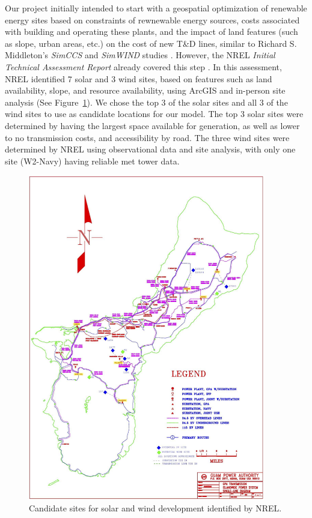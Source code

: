 \documentclass[12pt,letterpaper,fleqn]{article}
\begin{document}
Our project initially intended to start with a geospatial optimization
of renewable energy sites based on constraints of rewnewable energy
sources, costs associated with building and operating these plants,
and the impact of land features (such as slope, urban areas, etc.) on
the cost of new T\&D lines, similar to Richard S. Middleton's
\emph{SimCCS} and \emph{SimWIND} studies \cite{middleton09,
  phillips12}. However, the NREL \emph{Initial Technical Assessment
  Report} already covered this step \cite{misty}. In this assessment,
NREL identified 7 solar and 3 wind sites, based on features such as
land availability, slope, and resource availability, using ArcGIS and
in-person site analysis (See Figure~\ref{fig:sites}). We chose the top
3 of the solar sites and all 3 of the wind sites to use as candidate
locations for our model. The top 3 solar sites were determined by
having the largest space available for generation, as well as lower to
no transmission costs, and accessibility by road. The three wind sites
were determined by NREL using observational data and site analysis,
with only one site (W2-Navy) having reliable met tower data.

\begin{figure}[!h]
  \centering
  \includegraphics[width=0.925\textwidth]{img/sites}
  \caption{Candidate sites for solar and wind development identified by
    NREL.}
  \label{fig:sites}
\end{figure}
\end{document}
